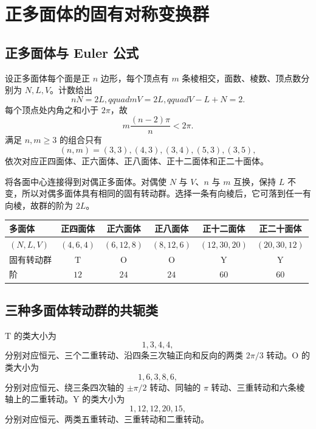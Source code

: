 \section{正多面体的固有对称变换群}
\subsection{正多面体与 Euler 公式}
设正多面体每个面是正 $n$ 边形，每个顶点有 $m$ 条棱相交，面数、棱数、顶点数分别为 $N,L,V$。计数给出
\begin{equation}
nN=2L,qquad mV=2L,qquad V-L+N=2.
\end{equation}
每个顶点处内角之和小于 $2\pi$，故
\begin{equation}
m\frac{\left(n-2\right)\pi}{n}<2\pi.
\end{equation}
满足 $n,m\geqslant3$ 的组合只有
\begin{equation}
\left(n,m\right)=\left(3,3\right),\left(4,3\right),\left(3,4\right),\left(5,3\right),\left(3,5\right),
\end{equation}
依次对应正四面体、正六面体、正八面体、正十二面体和正二十面体。

将各面中心连接得到对偶正多面体。对偶使 $N$ 与 $V$、$n$ 与 $m$ 互换，保持 $L$ 不变，所以对偶多面体具有相同的固有转动群。选择一条有向棱后，它可落到任一有向棱，故群的阶为 $2L$。
\begin{center}
\begin{tabular}{lccccc}
\toprule
多面体 & 正四面体 & 正六面体 & 正八面体 & 正十二面体 & 正二十面体\\ \midrule
$\left(N,L,V\right)$ & $\left(4,6,4\right)$ & $\left(6,12,8\right)$ & $\left(8,12,6\right)$ & $\left(12,30,20\right)$ & $\left(20,30,12\right)$\\
固有转动群 & $\mathrm{T}$ & $\mathrm{O}$ & $\mathrm{O}$ & $\mathrm{Y}$ & $\mathrm{Y}$\\
阶 & $12$ & $24$ & $24$ & $60$ & $60$\\ \bottomrule
\end{tabular}
\end{center}

\subsection{三种多面体转动群的共轭类}
$\mathrm{T}$ 的类大小为
\begin{equation}
1, 3, 4, 4,
\end{equation}
分别对应恒元、三个二重转动、沿四条三次轴正向和反向的两类 $2\pi/3$ 转动。$\mathrm{O}$ 的类大小为
\begin{equation}
1, 6, 3, 8, 6,
\end{equation}
分别对应恒元、绕三条四次轴的 $\pm\pi/2$ 转动、同轴的 $\pi$ 转动、三重转动和六条棱轴上的二重转动。$\mathrm{Y}$ 的类大小为
\begin{equation}
1, 12, 12, 20, 15,
\end{equation}
分别对应恒元、两类五重转动、三重转动和二重转动。

